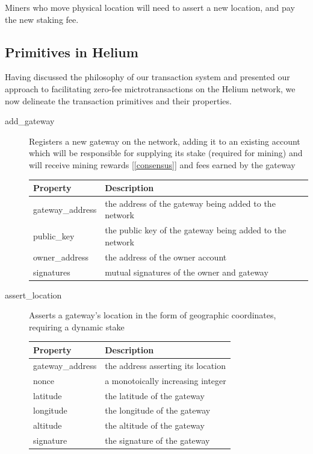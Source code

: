 \documentclass[10pt, nonatbib, nocopyrightspace, reprint]{sigplanconf}
\newcommand{\secref}[1]{[\autoref{#1}]}
\begin{document}
Miners who move physical location will need to assert a new location, and pay the new staking fee.

\subsection{Primitives in Helium} \label{primitives}
Having discussed the philosophy of our transaction system and presented our approach to facilitating zero-fee mictrotransactions on the Helium network, we now delineate the transaction primitives and their properties.

\begin{description}
  \item [add\_gateway] Registers a new gateway on the network, adding it to an existing account which will be responsible for supplying its stake (required for mining) and will receive mining rewards \secref{consensus} and fees earned by the gateway

\begin{table}[H]
  \centering
  \begin{tabularx}{\columnwidth}{l X}
    \toprule
    Property & Description \\ \midrule
    gateway\_address & the address of the gateway being added to the network \\
    public\_key & the public key of the gateway being added to the network \\
    owner\_address & the address of the owner account \\
    signatures & mutual signatures of the owner and gateway
  \end{tabularx}
\end{table}

\item [assert\_location] Asserts a gateway's location in the form of geographic coordinates, requiring a dynamic stake

\begin{table}[H]
  \centering
  \begin{tabularx}{\columnwidth}{l X}
      \toprule
      Property & Description \\ \midrule
      gateway\_address & the address asserting its location \\
      nonce & a monotoically increasing integer \\
      latitude & the latitude of the gateway \\
      longitude & the longitude of the gateway \\
      altitude & the altitude of the gateway \\
      signature & the signature of the gateway
  \end{tabularx}
\end{table}


\end{description}
\end{document}

